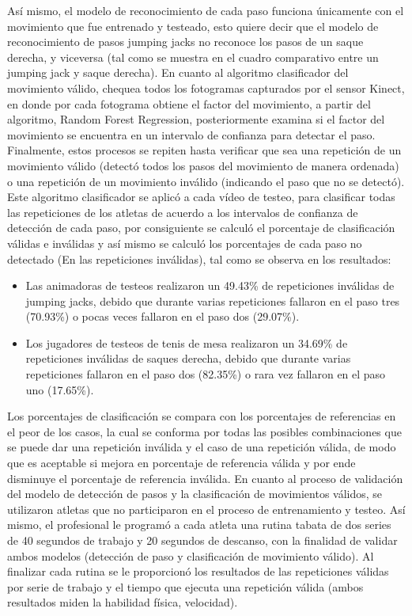 \medbreak
As\'i mismo, el modelo de reconocimiento de cada paso funciona \'unicamente con el movimiento que fue entrenado y testeado, esto quiere decir que el modelo de reconocimiento de pasos jumping jacks no reconoce los pasos de un saque derecha, y viceversa (tal como se muestra en el cuadro comparativo entre un jumping jack  y saque derecha).
En cuanto al algoritmo clasificador del movimiento v\'alido, chequea todos los fotogramas capturados por el sensor Kinect, en donde por cada fotograma obtiene el factor del movimiento, a partir del algoritmo, Random Forest Regression, posteriormente examina si el factor del movimiento se encuentra en un intervalo de confianza para detectar el paso. Finalmente, estos procesos se repiten hasta verificar que sea una repetici\'on de un movimiento v\'alido (detect\'o todos los pasos del movimiento de manera ordenada) o una repetici\'on de un movimiento inv\'alido (indicando el paso que no se detect\'o).
\medbreak
Este algoritmo clasificador se aplic\'o a cada v\'ideo de testeo, para clasificar todas las repeticiones de los atletas de acuerdo a los intervalos de confianza de detecci\'on de cada paso, por consiguiente se calcul\'o el porcentaje de clasificaci\'on v\'alidas e inv\'alidas y as\'i mismo se calcul\'o los porcentajes de cada paso no detectado (En las repeticiones inv\'alidas), tal como se observa en los resultados:
\begin{itemize}
\item	Las animadoras de testeos realizaron un 49.43\% de repeticiones inv\'alidas de jumping jacks, debido que durante varias repeticiones fallaron en el paso tres (70.93\%) o pocas veces fallaron en el paso dos (29.07\%).
\item	Los jugadores de testeos de tenis de mesa realizaron un 34.69\% de repeticiones inv\'alidas de saques derecha, debido que durante varias repeticiones fallaron en el paso dos (82.35\%) o rara vez fallaron en el paso uno (17.65\%).
\end{itemize}
Los porcentajes de clasificaci\'on se compara con los porcentajes de referencias en el peor de los casos, la cual se conforma por todas las posibles combinaciones que se puede dar una repetici\'on inv\'alida y el caso de una repetici\'on v\'alida, de modo que es aceptable si mejora en porcentaje de referencia v\'alida y por ende disminuye el porcentaje de referencia inv\'alida.
\medbreak
En cuanto al proceso de validaci\'on del modelo de detecci\'on de pasos y la clasificaci\'on de movimientos v\'alidos, se utilizaron atletas que no participaron en el proceso de entrenamiento y testeo. As\'i mismo, el profesional le program\'o a cada atleta una rutina tabata de dos series de 40 segundos de trabajo y 20 segundos de descanso, con la finalidad de validar ambos modelos (detecci\'on de paso y clasificaci\'on de movimiento v\'alido). Al finalizar cada rutina se le proporcion\'o los resultados de las repeticiones v\'alidas por serie de trabajo y el tiempo que ejecuta una repetici\'on v\'alida (ambos resultados miden la habilidad f\'isica, velocidad). 

